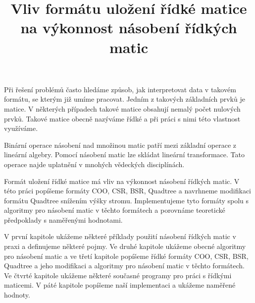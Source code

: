 \documentclass[thesis=B,czech]{FITthesis}[2012/06/26]
\title{Vliv formátu uložení řídké matice na výkonnost násobení řídkých matic}
\begin{document}

\begin{introduction}

Při řešení problémů často hledáme způsob, jak interpretovat data v takovém formátu, se kterým již umíme pracovat. Jedním z takových základních prvků je matice. V některých případech takové matice obsahují nemalý počet nulových prvků. Takové matice obecně nazýváme řídké a při práci s nimi této vlastnost využíváme.

Binární operace násobení nad množinou matic patří mezi základní operace z lineární algebry. Pomocí násobení matic lze skládat lineární transformace. Tato operace najde uplatnění v mnohých vědeckých disciplínách.

Formát uložení řídké matice má vliv na výkonnost násobení řídkých matic. V této práci popíšeme formáty COO, CSR, BSR, Quadtree a navrhneme modifikaci formátu Quadtree snížením výšky stromu. Implementujeme tyto formáty spolu s algoritmy pro násobení matic v těchto formátech a porovnáme teoretické předpoklady s naměřenými hodnotami.

V první kapitole ukážeme některé příklady použití násobení řídkých matic v praxi a definujeme některé pojmy. Ve druhé kapitole ukážeme obecné algoritmy pro násobení matic a ve třetí kapitole popíšeme řídké formáty COO, CSR, BSR, Quadtree a jeho modifikaci a algoritmy pro násobení matic v těchto formátech. Ve čtvrté kapitole ukážeme některé současné programy pro práci s řídkými maticemi. V páté kapitole popíšeme naší implementaci a ukážeme naměřené hodnoty.

\end{introduction}

\end{document}
